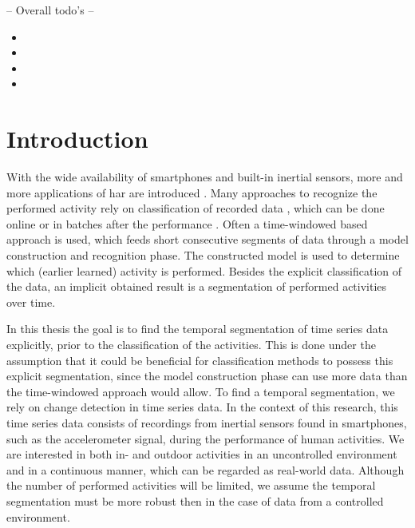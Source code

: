 
-- Overall todo's --
\begin{itemize}
  \item {}
  \item {}
  \item {}
  \item {}
\end{itemize}

\chapter{Introduction}

\label{Chapter1} %


With the wide availability of smartphones and built-in inertial sensors, more and more applications of \gls{har} are introduced \cite{avci2010activity,derawi2010accelerometer,guenterberg2009distributed}.
Many approaches to recognize the performed activity rely on classification of recorded data \cite{devaul2001real,ward2006activity,yang2008using,anguita2012human,bao2004activity,bernecker2012activity,he2008activity}, which can be done online or in batches after the performance \cite{duque2012offline}.
Often a time-windowed based approach is used, which feeds short consecutive segments of data through a model construction and recognition phase.
The constructed model is used to determine which (earlier learned) activity is performed.
Besides the explicit classification of the data, an implicit obtained result is a segmentation of performed activities over time.

In this thesis the goal is to find the temporal segmentation of time series data explicitly, prior to the classification of the activities.
This is done under the assumption that it could be beneficial for classification methods to possess this explicit segmentation, since the model construction phase can use more data than the time-windowed approach would allow.
To find a temporal segmentation, we rely on change detection in time series data.
In the context of this research, this time series data consists of recordings from inertial sensors found in smartphones, such as the accelerometer signal, during the performance of human activities.
We are interested in both in- and outdoor activities in an uncontrolled environment and in a continuous manner, which can be regarded as real-world data.
Although the number of performed activities will be limited, we assume the temporal segmentation must be more robust then in the case of data from a controlled environment.

